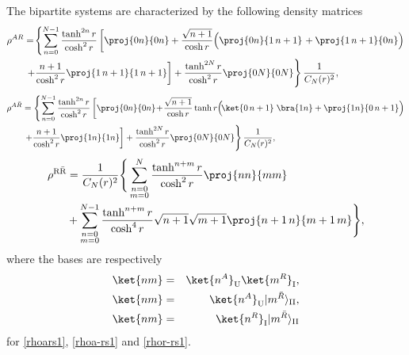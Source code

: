 The bipartite systems are characterized by the following density matrices
\begin{align}\label{rhoars1}
\rho^{AR}&=\!\left\{\sum_{n=0}^{N-1}\frac{\tanh^{2n}r}{\cosh^2r}\left[\proj{0n}{0n}+\frac{\sqrt{n+1}}{\cosh r}\Big(\proj{0n}{1\, n+1}\right.\nonumber+\proj{1\, n+1}{0n}\Big)\right.\nonumber\\*
&\left.\left.+\frac{n+1}{\cosh^2 r}\proj{1\,n+1}{1\,n+1}\right]+\frac{\tanh^{2N}r}{\cosh^2r}\proj{0N}{0N}\right\}\frac{1}{C_N(r)^2},
\end{align}
\begin{align}\label{rhoa-rs1}
\nonumber\rho^{A\bar R}&=\left\{\sum_{n=0}^{N-1}\frac{\tanh^{2n}r}{\cosh^2r}\left[\proj{0n}{0n}\!+\!\frac{\sqrt{n+1}}{\cosh r}\tanh r\Big(\!\ket{0\,n+1}\right.\bra{1 n}+\proj{1 n}{0\,n+1}\Big)\right.\nonumber\\*
&\left.\left.+\frac{n+1}{\cosh^2 r}\proj{1n}{1n}\right]+\frac{\tanh^{2N}r}{\cosh^2r}\proj{0N}{0N}\right\}\frac{1}{C_N(r)^2},
\end{align}
\begin{align}\label{rhor-rs1}
\nonumber\rho^{\text{R}{\bar{\text{R}}}}&=\frac{1}{C_N(r)^2}\Bigg\{\sum_{\substack{n=0\\m=0}}^{N}\frac{\tanh^{n+m}r}{\cosh^2r}\proj{nn}{mm}\\
&+\sum_{\substack{n=0\\m=0}}^{N-1}\frac{\tanh^{n+m}r}{\cosh^4r}\sqrt{n+1}\sqrt{m+1}\proj{n+1\,n}{m+1\,m}\Bigg\},
\end{align}
where the bases are respectively
\begin{eqnarray}\label{barbolbasis}
 \ket{nm}&=&\ket{n^A}_{\text{U}}\ket{m^R}_{\text{I}},\\*
\ket{nm}&=&\ket{n^A}_{\text{U}}|m^{\bar R}\rangle_{\text{II}},\\*
\ket{nm}&=&\ket{n^R}_{\text{I}}|m^{\bar R}\rangle_{\text{II}}
\end{eqnarray}
for \eqref{rhoars1}, \eqref{rhoa-rs1} and \eqref{rhor-rs1}.

